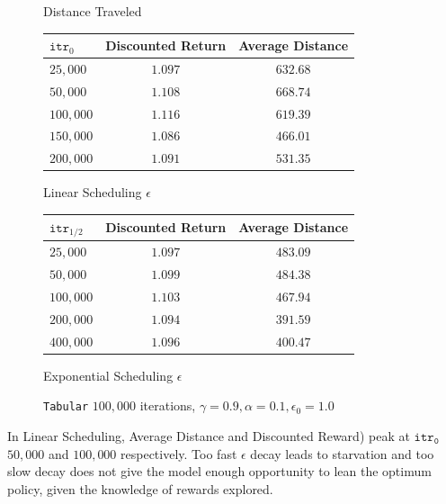 \begin{figure}[H]
\begin{minipage}{0.32\linewidth}
        \caption{Distance Traveled}
    \end{minipage}
    \vspace{1em}

    \begin{minipage}{0.49\linewidth}
        \centering
        \begin{tabular}{lcc}
        \hline
        $\texttt{itr}_0$ & Discounted Return & Average Distance \\
        \hline
        $25,000$ & $1.097$ & $632.68$\\ 
        $50,000$ & $1.108$ & $668.74$\\
        $100,000$ & $1.116$ & $619.39$ \\
        $150,000$ & $1.086$ & $466.01$ \\
        $200,000$ & $1.091$ & $531.35$ \\
        \hline
        \end{tabular}
        \caption{Linear Scheduling $\epsilon$}
        \label{tab:part1-d-linear}
    \end{minipage}
    \hfill
    \begin{minipage}{0.49\linewidth}
        \centering
        \begin{tabular}{lcc}
            \hline
            $\texttt{itr}_{1/2}$ & Discounted Return & Average Distance \\
            \hline
            $25,000$ & $1.097$ &  $483.09$\\
            $50,000$ & $1.099$ &  $484.38$\\
            $100,000$ & $1.103$ &  $467.94$\\
            $200,000$ & $1.094$ & $391.59$ \\
            $400,000$ & $1.096$ &  $400.47$\\
            \hline
        \end{tabular}
        \caption{Exponential Scheduling $\epsilon$}
    \end{minipage}
    \label{fig:part1-d}
    \caption{\texttt{Tabular} $100,000$ iterations, $\gamma = 0.9, \alpha = 0.1, \epsilon_0 = 1.0$} 
\end{figure}
In Linear Scheduling, Average Distance and Discounted Reward) peak at $\texttt{itr}_\texttt{0}$ $50,000$ and $100,000$ respectively. Too fast $\epsilon$ decay leads to starvation and too slow decay does not give the model enough opportunity to lean the optimum policy, given the knowledge of rewards explored. 


